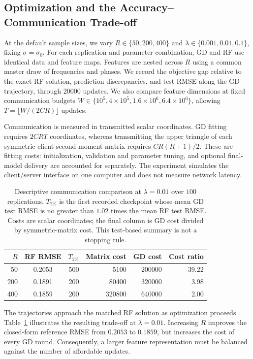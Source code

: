 \subsection{Optimization and the Accuracy--Communication Trade-off}
\label{Sec: simulation-communication}

At the default sample sizes, we vary $R\in\{50,200,400\}$ and
$\lambda\in\{0.001,0.01,0.1\}$, fixing $\sigma=\sigma_0$.
For each replication and parameter combination, GD and RF use identical
data and feature maps. Features are nested across $R$ using a common master
draw of frequencies and phases. We record the objective gap relative to
the exact RF solution, prediction discrepancies, and test RMSE along the
GD trajectory, through $20000$ updates. We also compare feature dimensions
at fixed communication budgets
$W\in\{10^5,4\times10^5,1.6\times10^6,6.4\times10^6\}$, allowing
$T=\lfloor W/(2CR)\rfloor$ updates.

Communication is measured in transmitted scalar coordinates. GD fitting
requires $2CRT$ coordinates, whereas transmitting the upper triangle of
each symmetric client second-moment matrix requires $CR(R+1)/2$.
These are fitting costs: initialization, validation and parameter tuning,
and optional final-model delivery are accounted for separately. The
experiment simulates the client/server interface on one computer and does
not measure network latency.

\begin{table}[htbp]
\centering
\caption{Descriptive communication comparison at $\lambda=0.01$ over
$100$ replications. $T_{2\%}$ is the first recorded checkpoint whose mean
GD test RMSE is no greater than $1.02$ times the mean RF test RMSE.
Costs are scalar coordinates; the final column is GD cost divided
by symmetric-matrix cost. This test-based summary is not a stopping rule.}
\label{tab:simulation-communication}
\small
\begin{tabular}{rcrrrr}
\toprule
$R$ & RF RMSE & $T_{2\%}$ & Matrix cost & GD cost & Cost ratio \\
\midrule
50  & 0.2053 & 500 & 5100   & 200000 & 39.22 \\
200 & 0.1891 & 200 & 80400  & 320000 & 3.98 \\
400 & 0.1859 & 200 & 320800 & 640000 & 2.00 \\
\bottomrule
\end{tabular}
\end{table}

The trajectories approach the matched RF solution as optimization proceeds.
Table~\ref{tab:simulation-communication} illustrates the resulting trade-off
at $\lambda=0.01$. Increasing $R$ improves the closed-form reference RMSE
from $0.2053$ to $0.1859$, but increases the cost of every GD round.
Consequently, a larger feature representation must be balanced against
the number of affordable updates.

